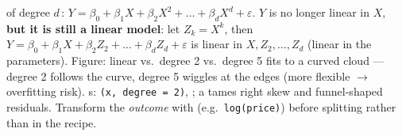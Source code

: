 \begin{keybox}
 of degree $d$\,: $Y=\beta_0+\beta_1X+\beta_2X^2+\dots+\beta_dX^d+\varepsilon$. $Y$ is no longer linear in $X$, \textbf{but it is still a linear model}: let $Z_k=X^k$, then $Y=\beta_0+\beta_1X+\beta_2Z_2+\dots+\beta_dZ_d+\varepsilon$ is linear in $X,Z_2,\dots,Z_d$ (linear in the parameters). Figure: linear vs.\ degree 2 vs.\ degree 5 fits to a curved cloud --- degree 2 follows the curve, degree 5 wiggles at the edges (more flexible $\to$ overfitting risk).
s: \texttt{(x, degree = 2)}, ; a  tames right skew and funnel-shaped residuals. Transform the \emph{outcome} with  (e.g.\ \texttt{log(price)}) before splitting rather than in the recipe.
\end{keybox}


